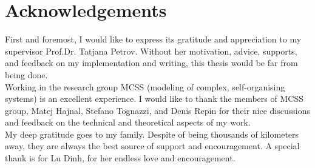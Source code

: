 \chapter*{Acknowledgements}
\thispagestyle{empty}

First and foremost, I would like to express its gratitude and appreciation to my supervisor
Prof.Dr. Tatjana Petrov. Without her motivation, advice, supports, and feedback on my implementation
and writing, this thesis would be far from being done.\\

\noindent Working in the research group MCSS (modeling of complex, self-organising systems) is an excellent
experience. I would like to thank the members of MCSS group, Matej Hajnal, Stefano Tognazzi, and
Denis Repin for their nice discussions and feedback on the technical and theoretical aspects of my
work.\\

\noindent My deep gratitude goes to my family. Despite of being thousands of kilometers away, they are
always the best source of support and encouragement. A special thank is for Lu Dinh, for her
endless love and encouragement.\\

\clearpage
